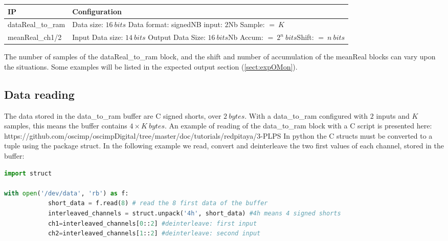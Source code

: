 \documentclass[12pt,oneside]{article}
\begin{document}
\begin{center}
	\begin{tabular}{|>{\centering\arraybackslash}m{.3\linewidth} | >{\centering\arraybackslash}m{.3\linewidth} |}
		\hline
		IP & Configuration \\
		\hline
		dataReal\_to\_ram&Data size: $16~bits$ \newline Data format: signed\newline NB input: $2$\newline Nb Sample: $=~K$\\
		\hline
		meanReal\_ch1/2&Input Data size: $14~bits$ \newline Output Data Size: $16~bits$\newline Nb Accum: $=~2^n~bits$\newline Shift: $=~n~bits$\\
		\hline
	\end{tabular}
\end{center}
\vspace{0.2cm}

The number of samples of the dataReal\_to\_ram block, and the shift and number of accumulation of the meanReal blocks can vary upon the situations. Some examples will be listed in the expected output section (\ref*{sect:expOMon}). 

\subsection{Data reading}\label{sect:datareading}

The data stored in the data\_to\_ram buffer are C signed shorts, over $2~bytes$. With a data\_to\_ram configured with $2$ inputs and $K$ samples, this means the buffer contains ${4\times K~bytes}$. An example of reading of the data\_to\_ram block with a C script is presented here:
\newline
https://github.com/oscimp/oscimpDigital/tree/master/doc/tutorials/redpitaya/3-PLPS
\newline\newline
In python the C structs must be converted to a tuple using the package struct. In the following example we read, convert and deinterleave the two first values of each channel, stored in the buffer:

\begin{lstlisting}[language=Python]
import struct

with open('/dev/data', 'rb') as f:
			short_data = f.read(8) # read the 8 first data of the buffer
			interleaved_channels = struct.unpack('4h', short_data) #4h means 4 signed shorts
			ch1=interleaved_channels[0::2] #deinterleave: first input
			ch2=interleaved_channels[1::2] #deinterleave: second input
\end{lstlisting}
\vspace{0.6cm}
\end{document}
